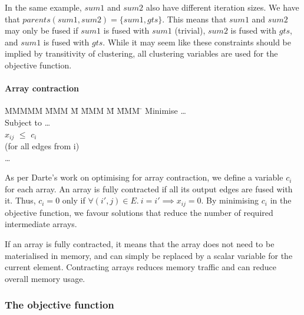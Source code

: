 In the same example, $sum1$ and $sum2$ also have different iteration sizes.
We have that $parents(sum1,sum2) = \{sum1, gts\}$.
This means that $sum1$ and $sum2$ may only be fused if $sum1$ is fused with $sum1$ (trivial), $sum2$ is fused with $gts$, and $sum1$ is fused with $gts$.
While it may seem like these constraints should be implied by transitivity of clustering, all clustering variables are used for the objective function.


\paragraph{Array contraction}
\begin{tabbing}
MMMMM   \= MMM \= M \= MMM \= M \= MMM \= \kill
Minimise   \> \ldots \\
Subject to \> \ldots \\
           \> $x_{ij}$    \> $\le$ \> $c_i$           \>       \>            \\
           \> (for all edges from i)            \\
           \> \ldots \\
\end{tabbing}
As per Darte's work on optimising for array contraction\cite{darte2002contraction}, we define a variable $c_i$ for each array.
An array is fully contracted if all its output edges are fused with it.
Thus, $c_i=0$ only if $\forall (i',j) \in E.\ i = i' \implies x_{ij} = 0$.
By minimising $c_i$ in the objective function, we favour solutions that reduce the number of required intermediate arrays.

If an array is fully contracted, it means that the array does not need to be materialised in memory, and can simply be replaced by a scalar variable for the current element. Contracting arrays reduces memory traffic and can reduce overall memory usage.


\subsubsection{The objective function}
\label{s:ObjectiveFunction}


